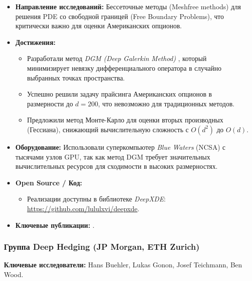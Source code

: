 \begin{itemize}
    \item \textbf{Направление исследований:} Бессеточные методы (Meshfree methods) для решения PDE со свободной границей (Free Boundary Problems), что критически важно для оценки Американских опционов.
    \item \textbf{Достижения:}
    \begin{itemize}
        \item Разработали метод \textit{DGM (Deep Galerkin Method)} \cite{Sirignano2018}, который минимизирует невязку дифференциального оператора в случайно выбранных точках пространства.
        \item Успешно решили задачу прайсинга Американских опционов в размерности до $d=200$, что невозможно для традиционных методов.
        \item Предложили метод Монте-Карло для оценки вторых производных (Гессиана), снижающий вычислительную сложность с $O(d^2)$ до $O(d)$.
    \end{itemize}
    \item \textbf{Оборудование:} Использовали суперкомпьютер \textit{Blue Waters} (NCSA) с тысячами узлов GPU, так как метод DGM требует значительных вычислительных ресурсов для сходимости в высоких размерностях.
    \item \textbf{Open Source / Код:}
    \begin{itemize}
        \item Реализации доступны в библиотеке \textit{DeepXDE}: \url{https://github.com/lululxvi/deepxde}.
    \end{itemize}
    \item \textbf{Ключевые публикации:} \cite{Sirignano2018}.
\end{itemize}

\subsubsection{Группа Deep Hedging (JP Morgan, ETH Zurich)}
\textbf{Ключевые исследователи:} Hans Buehler, Lukas Gonon, Josef Teichmann, Ben Wood.

